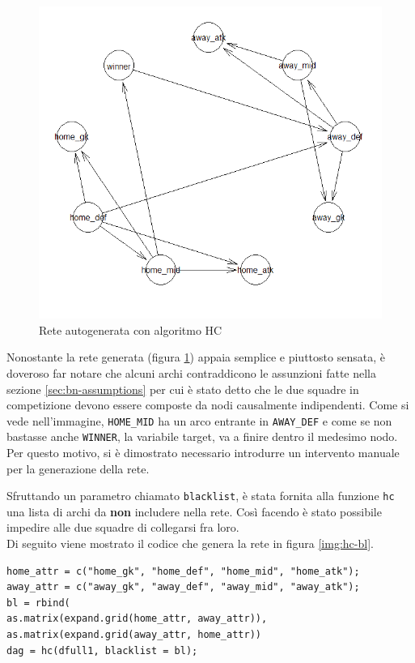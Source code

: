 \documentclass[hidelinks, 12pt]{article}
\begin{document}
\begin{figure}[H]
	\centering
	\includegraphics[scale=0.75]{images/05_01_hc_pure.png}
	\caption[Rete autogenerata con algoritmo HC]{Rete autogenerata con algoritmo HC}
	\label{img:hc-pure}
\end{figure}

Nonostante la rete generata (figura \ref{img:hc-pure}) appaia semplice e piuttosto sensata, è doveroso far notare che alcuni archi contraddicono le assunzioni fatte nella sezione \ref{sec:bn-assumptions} per cui è stato detto che le due squadre in competizione devono essere composte da nodi causalmente indipendenti. Come si vede nell'immagine, \texttt{HOME\_MID} ha un arco entrante in \texttt{AWAY\_DEF} e come se non bastasse anche \texttt{WINNER}, la variabile target, va a finire dentro il medesimo nodo. Per questo motivo, si è dimostrato necessario introdurre un intervento manuale per la generazione della rete.

Sfruttando un parametro chiamato \texttt{blacklist}, è stata fornita alla funzione \texttt{hc} una lista di archi da \textbf{non} includere nella rete. Così facendo è stato possibile impedire alle due squadre di collegarsi fra loro. \\
Di seguito viene mostrato il codice che genera la rete in figura \ref{img:hc-bl}.

\begin{verbatim}
home_attr = c("home_gk", "home_def", "home_mid", "home_atk");
away_attr = c("away_gk", "away_def", "away_mid", "away_atk");
bl = rbind(
as.matrix(expand.grid(home_attr, away_attr)),
as.matrix(expand.grid(away_attr, home_attr))
dag = hc(dfull1, blacklist = bl);
\end{verbatim}
\end{document}
